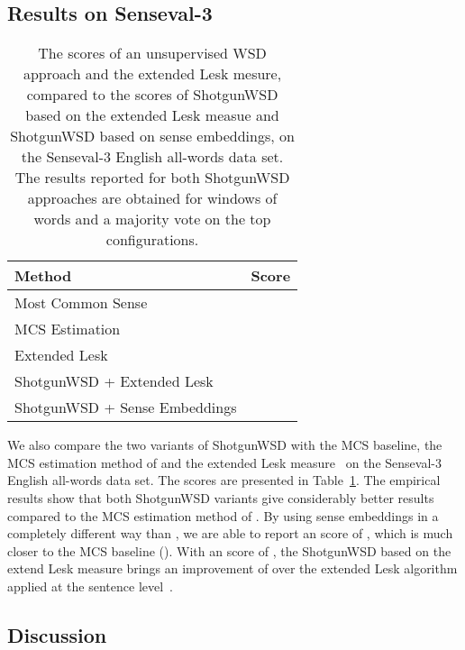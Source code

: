 \documentclass[11pt]{article}
\begin{document}
\subsection{Results on Senseval-3}

\begin{table}[h]
\small{
\begin{center}
\begin{tabular}{|l|r|}
\hline
Method 																										&  Score\\
\hline
Most Common Sense																					& \\
MCS Estimation~\cite{Bhingardive-NAACL-2015} 										& \\
Extended Lesk~\cite{Torres-Lesk-2009}														& \\
\hline
ShotgunWSD + Extended Lesk																		& \\
ShotgunWSD + Sense Embeddings																& \\
\hline
\end{tabular}
\end{center}
\caption{\label{tab_Senseval3_Results} The  scores of an unsupervised WSD approach and the extended Lesk mesure, compared to the  scores of ShotgunWSD based on the extended Lesk measue and ShotgunWSD based on sense embeddings, on the Senseval-3 English all-words data set. The results reported for both ShotgunWSD approaches are obtained for windows of  words and a majority vote on the top  configurations.}
}
\end{table}

We also compare the two variants of ShotgunWSD with the MCS baseline, the MCS estimation method of  and the extended Lesk measure~\cite{Torres-Lesk-2009} on the Senseval-3 English all-words data set. The  scores are presented in Table~\ref{tab_Senseval3_Results}. The empirical results show that both ShotgunWSD variants give considerably better results compared to the MCS estimation method of . By using sense embeddings in a completely different way than , we are able to report an  score of , which is much closer to the MCS baseline (). With an  score of , the ShotgunWSD based on the extend Lesk measure brings an improvement of  over the extended Lesk algorithm applied at the sentence level~\cite{Torres-Lesk-2009}.

\subsection{Discussion}
\end{document}
